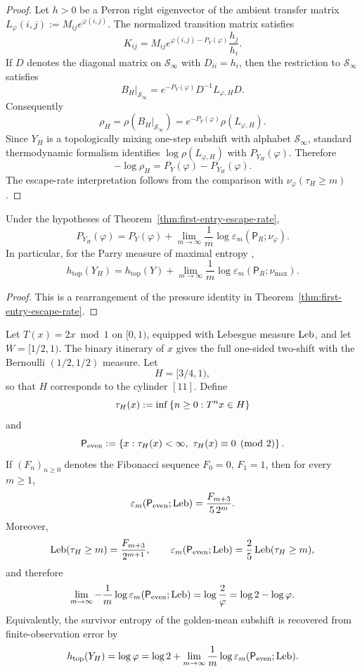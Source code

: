 \begin{proof}
Let \(h>0\) be a Perron right eigenvector of the ambient transfer matrix
\(L_\varphi(i,j):=M_{ij}e^{\varphi(i,j)}\).  The normalized transition
matrix satisfies
\[
  K_{ij}
  = M_{ij}e^{\varphi(i,j)-P_Y(\varphi)}\frac{h_j}{h_i}.
\]
If \(D\) denotes the diagonal matrix on \(\mathcal S_\infty\) with
\(D_{ii}=h_i\), then the restriction to \(\mathcal S_\infty\) satisfies
\[
  B_H|_{\mathcal S_\infty}=e^{-P_Y(\varphi)}D^{-1}L_{\varphi,H}D.
\]
Consequently
\[
  \rho_H
  = \rho(B_H|_{\mathcal S_\infty})
  = e^{-P_Y(\varphi)}\rho(L_{\varphi,H}).
\]
Since \(Y_H\) is a topologically mixing one-step subshift with alphabet
\(\mathcal S_\infty\), standard thermodynamic formalism identifies
\(\log\rho(L_{\varphi,H})\) with \(P_{Y_H}(\varphi)\).  Therefore
\[
  -\log\rho_H
  = P_Y(\varphi)-P_{Y_H}(\varphi).
\]
The escape-rate interpretation follows from the comparison with
\(\nu_\varphi(\tau_H\geq m)\).
\end{proof}

\begin{corollary}
\label{cor:survivor-pressure-recovery}
Under the hypotheses of
Theorem~\ref{thm:first-entry-escape-rate},
\[
  P_{Y_H}(\varphi)
  = P_Y(\varphi)
    + \lim_{m\to\infty}\frac1m
      \log \varepsilon_m(\mathsf{P}_R;\nu_\varphi).
\]
In particular, for the Parry measure of maximal entropy
\cite{Parry1964},
\[
  h_{\mathrm{top}}(Y_H)
  = h_{\mathrm{top}}(Y)
    + \lim_{m\to\infty}\frac1m
      \log \varepsilon_m(\mathsf{P}_R;\nu_{\max}).
\]
\end{corollary}

\begin{proof}
This is a rearrangement of the pressure identity in
Theorem~\ref{thm:first-entry-escape-rate}.
\end{proof}

\begin{proposition}
\label{prop:doubling-fibonacci-escape}
Let \(T(x)=2x\bmod 1\) on \([0,1)\), equipped with Lebesgue measure
\(\mathrm{Leb}\), and let \(W=[1/2,1)\).  The binary itinerary of \(x\) gives
the full one-sided two-shift with the Bernoulli \((1/2,1/2)\) measure.
Let
\[
  H=[3/4,1),
\]
so that \(H\) corresponds to the cylinder \([11]\).  Define
\[
  \tau_H(x):=\inf\left\{n\geq 0:T^n x\in H\right\}
\]
and
\[
  \mathsf{P}_{\mathrm{even}}
  := \left\{x:\tau_H(x)<\infty,\ \tau_H(x)\equiv 0 \pmod 2\right\}.
\]
If \((F_n)_{n\geq 0}\) denotes the Fibonacci sequence
\(F_0=0\), \(F_1=1\), then for every \(m\geq 1\),
\[
  \varepsilon_m(\mathsf{P}_{\mathrm{even}};\mathrm{Leb})
  = \frac{F_{m+3}}{5\,2^m}.
\]
Moreover,
\[
  \mathrm{Leb}(\tau_H\geq m)=\frac{F_{m+3}}{2^{m+1}},
  \qquad
  \varepsilon_m(\mathsf{P}_{\mathrm{even}};\mathrm{Leb})
  = \frac25\,\mathrm{Leb}(\tau_H\geq m),
\]
and therefore
\[
  \lim_{m\to\infty}
  -\frac1m\log\varepsilon_m(\mathsf{P}_{\mathrm{even}};\mathrm{Leb})
  = \log\frac{2}{\varphi}
  = \log 2-\log\varphi.
\]
Equivalently, the survivor entropy of the golden-mean subshift is
recovered from finite-observation error by
\[
  h_{\mathrm{top}}(Y_H)
  = \log\varphi
  = \log 2
    + \lim_{m\to\infty}\frac1m
      \log \varepsilon_m(\mathsf{P}_{\mathrm{even}};\mathrm{Leb}).
\]
\end{proposition}

